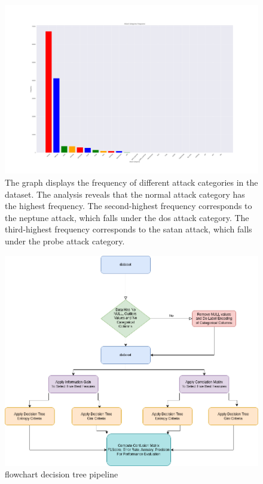 \documentclass{article}
\begin{document}
\begin{figure}[htbp]
\centering
\includegraphics[scale=0.2]{figures/attack_categories_frequencies.png}
\caption{The graph displays the frequency of different attack categories in the dataset. The analysis reveals that the normal attack category has the highest frequency. The second-highest frequency corresponds to the neptune attack, which falls under the dos attack category. The third-highest frequency corresponds to the satan attack, which falls under the probe attack category.}
\label{fig:attack_categories_frequencies}
\end{figure}

\begin{figure}[htbp]
\centering
\includegraphics[scale=0.5]{figures/decision_tree.drawio.png}
\caption{flowchart decision tree pipeline}
\label{fig:dt_pipeline}
\end{figure}
\end{document}
